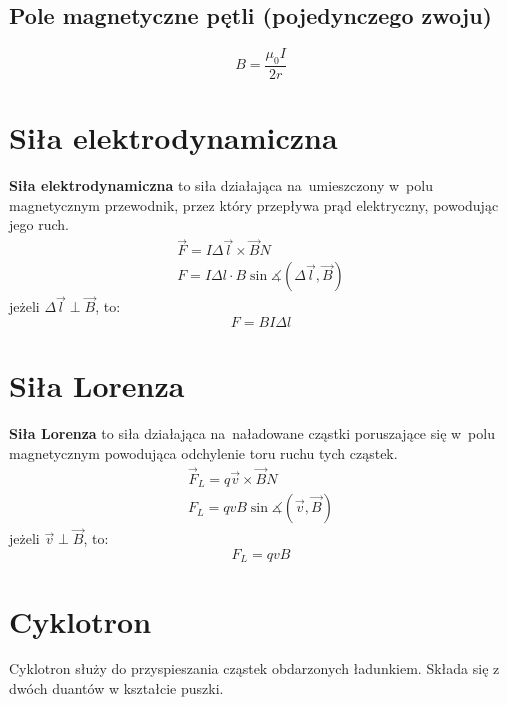    \subsection{Pole magnetyczne pętli (pojedynczego zwoju)}
      \begin{equation*}
        B = \frac{\mu_0 I}{2r}
      \end{equation*}

  \section{Siła elektrodynamiczna}
    \begin{definition}
      \textbf{Siła elektrodynamiczna} to siła działająca na~umieszczony w~polu magnetycznym przewodnik, przez który przepływa prąd elektryczny, powodując jego ruch.
      \begin{gather*}
          \vec F = I\Delta\vec l\times\vec B \unit{N}\\
          F = I\Delta l\cdot B\sin\measuredangle(\Delta\vec l, \vec B)
      \end{gather*}
      jeżeli $\Delta\vec l \perp \vec B$, to:
      \begin{equation}
        \boxed{F = BI\Delta l}
      \end{equation}
    \end{definition}

  \section{Siła Lorenza}
    \begin{definition}
      \textbf{Siła Lorenza} to siła działająca na~naładowane cząstki poruszające się w~polu magnetycznym powodująca odchylenie toru ruchu tych cząstek.
    \begin{gather*}
      \vec F_L = q\vec v\times\vec B \unit{N}\\
      F_L = qvB\sin\measuredangle(\vec v, \vec B)
    \end{gather*}
    jeżeli $\vec v\perp\vec B$, to:
    \begin{equation}
      \boxed{F_L = qvB}
    \end{equation}
    \end{definition}

  \section{Cyklotron}
    Cyklotron służy do przyspieszania cząstek obdarzonych ładunkiem. Składa się z dwóch duantów w kształcie puszki.
